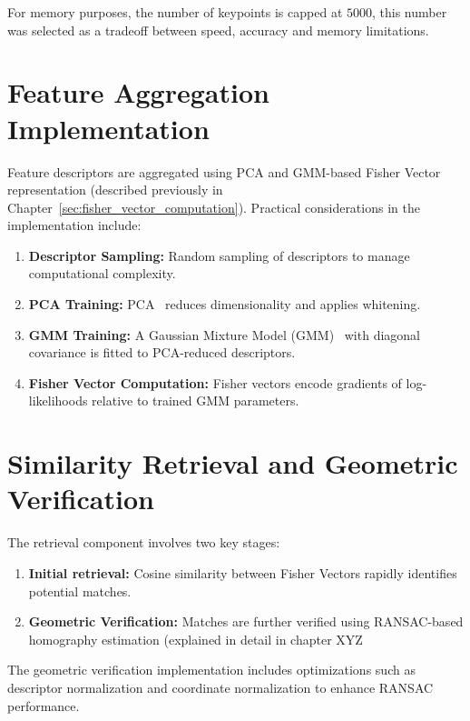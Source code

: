 For memory purposes, the number of keypoints is capped at $5000$, this number was selected as a tradeoff between speed, accuracy and memory limitations.
\section{Feature Aggregation Implementation}
\label{sec:fv_implementation}

Feature descriptors are aggregated using PCA and GMM-based Fisher Vector representation (described previously in Chapter~\ref{sec:fisher_vector_computation}). Practical considerations in the implementation include:
\begin{enumerate}
    \item \textbf{Descriptor Sampling:} Random sampling of descriptors to manage computational complexity.
    \item \textbf{PCA Training:} PCA~\cite{sklearn_api} reduces dimensionality and applies whitening.
    \item \textbf{GMM Training:} A Gaussian Mixture Model (GMM)~\cite{sklearn_api} with diagonal covariance is fitted to PCA-reduced descriptors.
    \item \textbf{Fisher Vector Computation:} Fisher vectors encode gradients of log-likelihoods relative to trained GMM parameters.
\end{enumerate}

\section{Similarity Retrieval and Geometric Verification}
\label{sec:similarity_verification_implementation}

The retrieval component involves two key stages:

\begin{enumerate}
    \item \textbf{Initial retrieval:} Cosine similarity between Fisher Vectors rapidly identifies potential matches.
    \item \textbf{Geometric Verification:} Matches are further verified using RANSAC-based homography estimation (explained in detail in chapter XYZ
\end{enumerate}

The geometric verification implementation includes optimizations such as descriptor normalization and coordinate normalization to enhance RANSAC performance.
